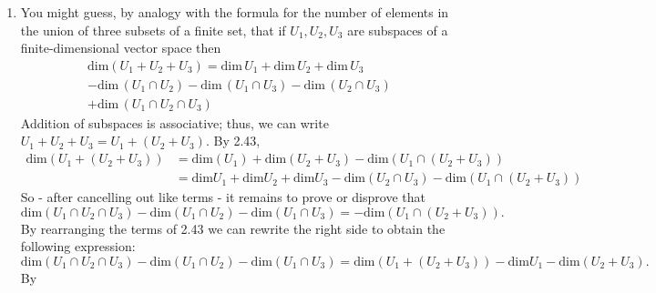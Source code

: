 \documentclass{book}
\begin{document}
\begin{enumerate}
\item You might guess, by analogy with the formula for the number of elements in the union of three subsets of a finite set, that if \(U_1,U_2,U_3\) are subspaces of a finite-dimensional vector space then
\begin{multline*}
\textrm{dim}(U_1+U_2+U_3)=\textrm{dim} \, U_1+\textrm{dim} \, U_2+\textrm{dim} \, U_3 \\
-\textrm{dim} \, (U_1 \cap U_2)-\textrm{dim} \, (U_1 \cap U_3)-\textrm{dim} \, (U_2 \cap U_3) \\
+\textrm{dim} \, (U_1 \cap U_2 \cap U_3)
\end{multline*}
Addition of subspaces is associative; thus, we can write \(U_1+U_2+U_3=U_1+(U_2+U_3)\).  By 2.43, 
\begin{equation*}
\begin{split}
\textrm{dim}(U_1+(U_2+U_3)) &= \textrm{dim}(U_1)+\textrm{dim}(U_2+U_3)-\textrm{dim}(U_1 \cap (U_2 + U_3)) \\
&=\textrm{dim}U_1+\textrm{dim}U_2+\textrm{dim}U_3-\textrm{dim}(U_2 \cap U_3)-\textrm{dim}(U_1 \cap (U_2+U_3)) 
\end{split}
\end{equation*}
So - after cancelling out like terms - it remains to prove or disprove that
\[\textrm{dim}(U_1 \cap U_2 \cap U_3)-\textrm{dim}(U_1 \cap U_2)-\textrm{dim}(U_1 \cap U_3)=-\textrm{dim}(U_1 \cap (U_2+U_3)).\]
By rearranging the terms of 2.43 we can rewrite the right side to obtain the following expression:
\[\textrm{dim}(U_1 \cap U_2 \cap U_3)-\textrm{dim}(U_1 \cap U_2)-\textrm{dim}(U_1 \cap U_3)=\textrm{dim}(U_1 + (U_2+U_3))-\textrm{dim}U_1-\textrm{dim}(U_2+U_3).\]
By 
\end{enumerate}
\end{document}
